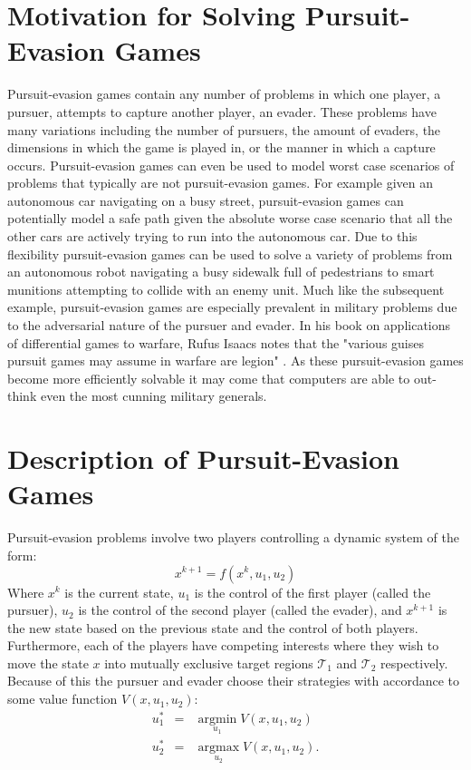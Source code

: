 \section{Motivation for Solving Pursuit-Evasion Games}
Pursuit-evasion games contain any number of problems in which one player, a pursuer, attempts to capture another player, an evader. These problems have many variations including the number of pursuers, the amount of evaders, the dimensions in which the game is played in, or the manner in which a capture occurs. Pursuit-evasion games can even be used to model worst case scenarios of problems that typically are not pursuit-evasion games. For example given an autonomous car navigating on a busy street, pursuit-evasion games can potentially model a safe path given the absolute worse case scenario that all the other cars are actively trying to run into the autonomous car. Due to this flexibility pursuit-evasion games can be used to solve a variety of problems from an autonomous robot navigating a busy sidewalk full of pedestrians to smart munitions attempting to collide with an enemy unit. Much like the subsequent example, pursuit-evasion games are especially prevalent in military problems due to the adversarial nature of the pursuer and evader. In his book on applications of differential games to warfare, Rufus Isaacs notes that the "various guises pursuit games may assume in warfare are legion" \cite{isaacs}. As these pursuit-evasion games become more efficiently solvable it may come that computers are able to out-think even the most cunning military generals.          


\section{Description of Pursuit-Evasion Games}\label{pegames}


Pursuit-evasion problems involve two players controlling a dynamic system of the form: 
\begin{equation*}
x^{k+1}=f(x^k, u_1, u_2)
\end{equation*}
Where $x^k$ is the current state, $u_1$ is the control of the first player (called the pursuer), $u_2$ is the control of the second player (called the evader), and $x^{k+1}$ is the new state based on the previous state and the control of both players. Furthermore, each of the players have competing interests where they wish to move the state $x$ into mutually exclusive target regions $\mathscr{T}_1$ and $\mathscr{T}_2$ respectively. Because of this the pursuer and evader choose their strategies with accordance to some value function $V(x,u_1,u_2)$: 
\begin{eqnarray}\label{gameqn}
u_1^* & = & \underset{u_1}{\operatorname{argmin}}V(x,u_1,u_2)\\
u_2^* & = & \underset{u_2}{\operatorname{argmax}}V(x,u_1,u_2).
\end{eqnarray}



